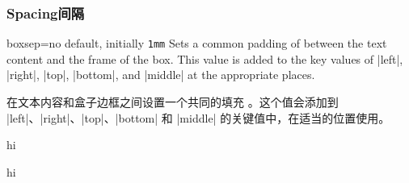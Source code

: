 
\subsubsection{Spacing\hfill 间隔}
\begin{docTcbKey}{boxsep}{=}{no default, initially \texttt{1mm}}
Sets a common padding of  between the text content and the
frame of the box. This value is added to the key values of
|left|, |right|, |top|, |bottom|, and |middle| at the appropriate places.


在文本内容和盒子边框之间设置一个共同的填充 。这个值会添加到 |left|、|right|、|top|、|bottom| 和 |middle| 的关键值中，在适当的位置使用。

\begin{dispExample*}{}
\begin{tcolorbox}[boxsep=5mm]
hi
\end{tcolorbox}
\begin{tcolorbox}[boxsep=5mm,draft]
hi
\end{tcolorbox}
\end{dispExample*}

\end{docTcbKey}


